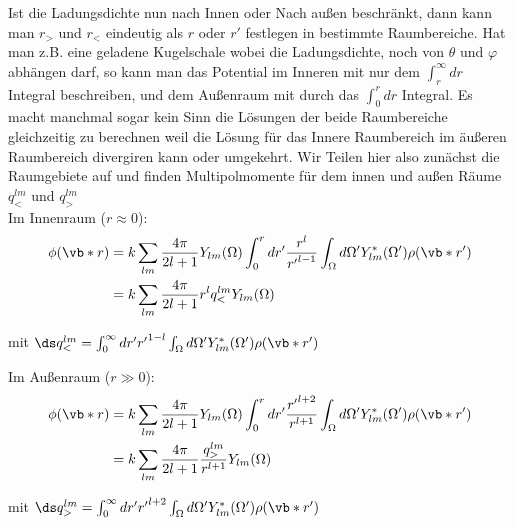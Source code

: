 Ist die Ladungsdichte nun nach Innen oder Nach außen beschränkt, dann kann
man $r_>$ und $r_<$ eindeutig als $r$ oder $r'$ festlegen in bestimmte 
Raumbereiche. Hat man z.B. eine geladene Kugelschale wobei die 
Ladungsdichte, noch von $\theta$ und $\varphi$ abhängen darf, so kann man
das Potential im Inneren mit nur dem $\int_r^\infty dr$ Integral beschreiben, und
dem Außenraum mit durch das $\int_0^r dr$ Integral. Es macht manchmal 
sogar kein Sinn die Lösungen der beide Raumbereiche gleichzeitig zu 
berechnen weil die Lösung für das Innere Raumbereich im äußeren Raumbereich
divergiren kann oder umgekehrt. Wir Teilen hier also zunächst die 
Raumgebiete auf und finden Multipolmomente für dem innen und außen Räume 
$q_<^{lm}$ und $q_>^{lm}$\\

\noindent
Im Innenraum ($r\approx 0$):
\begin{equation}
  \begin{split}
    \phi(\vb*r) 
    &= k\sum_{lm} \frac{4\pi}{2l+1} Y_{lm}(\Omega)
    \int_0^{r} dr'\frac{{r}^{l}}{{r'}^{l-1}}
    \int_\Omega d\Omega'Y^*_{lm}(\Omega')\rho(\vb*r')\\
    &= k\sum_{lm} \frac{4\pi}{2l+1}r^l q_<^{lm} Y_{lm}(\Omega) 
  \end{split}
\end{equation}
\begin{center}
  mit $\ds q_<^{lm}=\int_0^\infty dr' {r'}^{1-l}
  \int_\Omega d\Omega' Y^*_{lm}(\Omega')\rho(\vb*r')$
\end{center}
\noindent
Im Außenraum ($r\gg0$):
\begin{equation}
  \begin{split}
    \phi(\vb*r) 
    &= k\sum_{lm} \frac{4\pi}{2l+1} Y_{lm}(\Omega)
    \int_0^{r} dr'\frac{{r'}^{l+2}}{r^{l+1}}
    \int_\Omega d\Omega'Y^*_{lm}(\Omega')\rho(\vb*r')\\
    &= k\sum_{lm} \frac{4\pi}{2l+1} 
    \frac{q_>^{lm}}{r^{l+1}} Y_{lm}(\Omega) 
  \end{split}
\end{equation}
\begin{center}
  mit $\ds q_>^{lm}=\int_0^\infty dr' {r'}^{l+2}
  \int_\Omega d\Omega' Y^*_{lm}(\Omega')\rho(\vb*r')$
\end{center}
